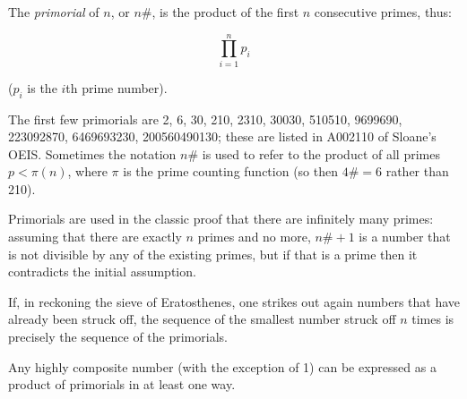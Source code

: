 \documentclass[12pt]{article}
\begin{document}
The {\em primorial} of $n$, or $n\#$, is the product of the first $n$ consecutive primes, thus:

$$\prod_{i = 1}^n p_i$$

($p_i$ is the $i$th prime number).

The first few primorials are 2, 6, 30, 210, 2310, 30030, 510510, 9699690, 223092870, 6469693230, 200560490130; these are listed in A002110 of Sloane's OEIS. Sometimes the notation $n\#$ is used to refer to the product of all primes $p < \pi(n)$, where $\pi$ is the prime counting function (so then $4\# = 6$ rather than 210).

Primorials are used in the classic proof that there are infinitely many primes: assuming that there are exactly $n$ primes and no more, $n\# + 1$ is a number that is not divisible by any of the existing primes, but if that is a prime then it contradicts the initial assumption.

If, in reckoning the sieve of Eratosthenes, one strikes out again numbers that have already been struck off, the sequence of the smallest number struck off $n$ times is precisely the sequence of the primorials.

Any highly composite number (with the exception of 1) can be expressed as a product of primorials in at least one way.
\end{document}
